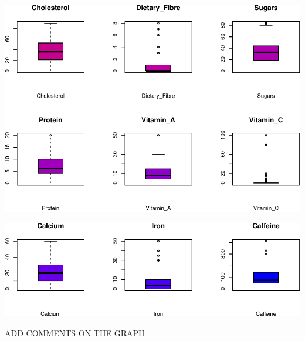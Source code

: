 \documentclass[
]{article}
\begin{document}
\begin{center}\includegraphics{Statistical_Learning_Final_Report_files/figure-latex/boxplot-2} \end{center}

\begin{center}\includegraphics{Statistical_Learning_Final_Report_files/figure-latex/boxplot-3} \end{center}

ADD COMMENTS ON THE GRAPH
\end{document}
